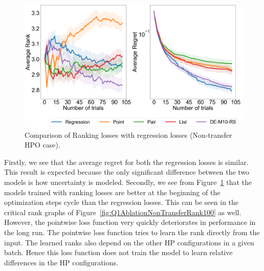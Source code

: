 \documentclass[12pt, twoside, ngerman]{report}
\begin{document}
\begin{figure}[h]
  \centering
    \includegraphics[scale=0.25]{images/Q1AblationNonTransfer}
    \caption{Comparison of Ranking losses with regression losses (Non-transfer HPO case).}
    \label{fig:Q1AblationNonTransfer}
\end{figure}

Firstly, we see that the average regret for both the regression losses is similar. This result is expected because the only significant difference between the two models is how uncertainty is modeled. Secondly,  we see from Figure~\ref{fig:Q1AblationNonTransfer} that the models trained with ranking losses are better at the beginning of the optimization steps cycle than the regression losses. This can be seen in the critical rank graphs of Figure~\ref{fig:Q1AblationNonTransferRank100} as well. However, the pointwise loss function very quickly deteriorates in performance in the long run. The pointwise loss function tries to learn the rank directly from the input. The learned ranks also depend on the other HP configurations in a given batch. Hence this loss function does not train the model to learn relative differences in the HP configurations.
\end{document}

